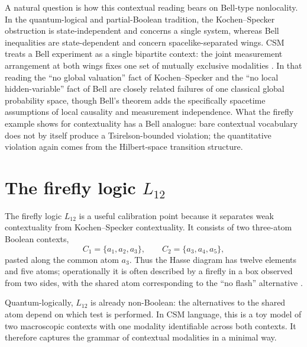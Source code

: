 \documentclass[
aps,
pra,
reprint,
superscriptaddress,
nofootinbib,
longbibliography
]{revtex4-2}
\begin{document}
A natural question is how this contextual reading bears on Bell-type
nonlocality.  In the quantum-logical and partial-Boolean tradition, the
Kochen--Specker obstruction is state-independent and concerns a single system,
whereas Bell inequalities are state-dependent and concern spacelike-separated
wings.  CSM treats a Bell experiment as a single bipartite context: the joint
measurement arrangement at both wings fixes one set of mutually exclusive
modalities \cite{grangier2025kc}.  In that reading the ``no global valuation''
fact of Kochen--Specker and the ``no local hidden-variable'' fact of Bell are
closely related failures of one classical global probability space, though
Bell's theorem adds the specifically spacetime assumptions of local causality
and measurement independence.  What the firefly example shows for
contextuality has a Bell analogue: bare contextual vocabulary does not by
itself produce a Tsirelson-bounded violation; the quantitative violation again
comes from the Hilbert-space transition structure.

\section{\texorpdfstring{The firefly logic $L_{12}$}{The firefly logic L12}}

The firefly logic $L_{12}$ is a useful calibration point because it separates
weak contextuality from Kochen--Specker contextuality.  It consists of two
three-atom Boolean contexts,
\begin{equation}
C_1=\{a_1,a_2,a_3\},\qquad
C_2=\{a_3,a_4,a_5\},
\end{equation}
pasted along the common atom $a_3$.  Thus the Hasse diagram has twelve
elements and five atoms; operationally it is often described by a firefly in a
box observed from two sides, with the shared atom corresponding to the
``no flash'' alternative \cite{cohen1989,foulis1974,svozil1998,svozil2020}.

Quantum-logically, $L_{12}$ is already non-Boolean: the alternatives to the
shared atom depend on which test is performed.  In CSM language, this is a toy
model of two macroscopic contexts with one modality identifiable across both
contexts.  It therefore captures the grammar of contextual modalities in a
minimal way.
\end{document}
